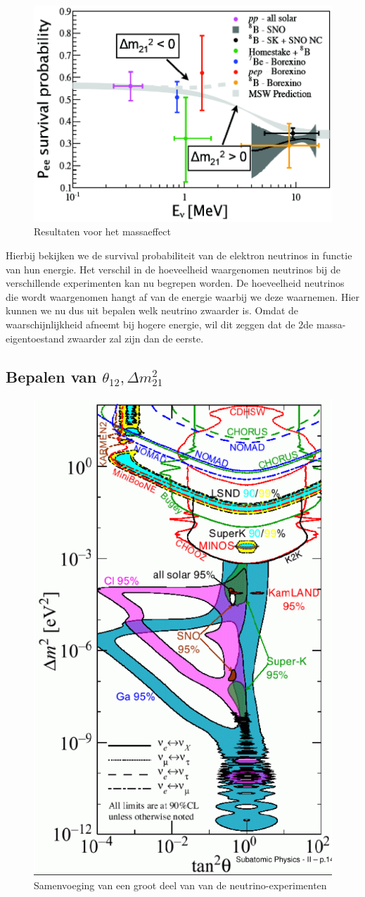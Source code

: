 \documentclass[../main.tex]{subfiles}
\begin{document}
\begin{figure}[h]
    \centering
    \includegraphics[width=0.5\linewidth]{neutrinos/msw_resultaten.png}
    \caption{Resultaten voor het massaeffect}%
    \label{fig:neutrinos/msw_resultaten}
\end{figure}

Hierbij bekijken we de survival probabiliteit van de elektron neutrinos in functie van hun energie. Het verschil in de hoeveelheid waargenomen neutrinos bij de verschillende experimenten kan nu begrepen worden. De hoeveelheid neutrinos die wordt waargenomen hangt af van de energie waarbij we deze waarnemen. Hier kunnen we nu dus uit bepalen welk neutrino zwaarder is. Omdat de waarschijnlijkheid afneemt bij hogere energie, wil dit zeggen dat de 2de massa-eigentoestand zwaarder zal zijn dan de eerste.

\subsection{Bepalen van $\theta_{12}, \Delta m_{21}^{2}$}%
\label{sub:bepalen_van_de_parameters}

\begin{figure}[h]
    \centering
    \includegraphics[width=0.6\linewidth]{neutrinos/alle_neutrino_resultaten.png}
    \caption{Samenvoeging van een groot deel van van de neutrino-experimenten}%
    \label{fig:neutrinos/alle_neutrino_resultaten}
\end{figure}
\end{document}
